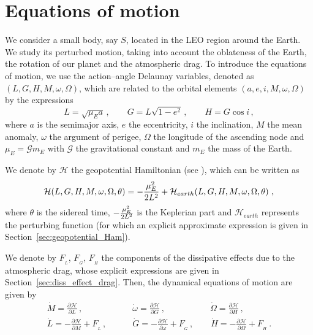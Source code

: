 \documentclass[12pt,reqno]{amsart}
\numberwithin{equation}{section}
\newcommand\beq[1]{ \begin{equation}\label{#1} }
\newcommand{\eeq}{ \end{equation} }
\def\G{{\mathcal G}}
\begin{document}
\section{Equations of motion}\label{sec:equations_of_motion}

We consider a small body, say $S$, located in the LEO region around the Earth.
We study its perturbed motion, taking into account the oblateness of the Earth, the rotation of our planet
and the atmospheric drag. To introduce the equations of motion, we use the action--angle Delaunay variables, denoted as $(L,G,H,M,\omega,\Omega)$, which are related to the orbital elements $(a,e,i,M,\omega,\Omega)$ by the expressions
\begin{equation}\label{LGH_aei}
L=\sqrt{\mu_E a}\,,\qquad  G=L \sqrt{1-e^2}\,, \qquad H=G \cos i\,,
\end{equation}
where $a$ is the semimajor axis,
$e$ the eccentricity, $i$ the inclination, $M$ the mean anomaly, $\omega$ the argument of perigee,
$\Omega$ the longitude of the ascending node and $\mu_E=\G m_E$ with $\G$ the gravitational constant and $m_E$ the mass of the Earth.

We denote by $\mathcal{H}$ the geopotential Hamiltonian (see \cite{CGmajor}), which can be written as
\beq{H}
\mathcal{H}(L,G,H,M,\omega,\Omega,\theta)=-{\mu^2_E\over {2L^2}}+\mathcal{H}_{earth}(L,G,H,M,\omega,\Omega,\theta)\ ,
\eeq
where $\theta$ is the sidereal time, $-{\mu^2_E\over {2L^2}}$ is the Keplerian part
and $\mathcal{H}_{earth}$ represents the perturbing function
(for which an explicit approximate expression is given in Section~\ref{sec:geopotential_Ham}).

We denote by $F_{_L}$, $F_{_G}$, $F_{_H}$ the components of
the dissipative effects due to the atmospheric drag, whose explicit expressions are given in Section~\ref{sec:diss_effect_drag}.
Then, the dynamical equations of motion are given by
\begin{equation} \label{canonical_eq}
\begin{split}
\dot{M}=\frac{\partial \mathcal{H}}{\partial L}\,,\qquad \quad & \qquad   \dot{\omega}=\frac{\partial \mathcal{H}}{\partial G}\,,
\ \quad \qquad \qquad \dot{\Omega}=\frac{\partial \mathcal{H}}{\partial H}\, ,\\
 \dot{L}=-\frac{\partial \mathcal{H}}{\partial M}+F_{_L}\,, & \qquad \dot{G}=
 -\frac{\partial \mathcal{H}}{\partial \omega}+F_{_G}\,, \qquad \dot{H}=
 -\frac{\partial \mathcal{H}}{\partial \Omega}+F_{_H}\ .
\end{split}
\end{equation}
\end{document}
